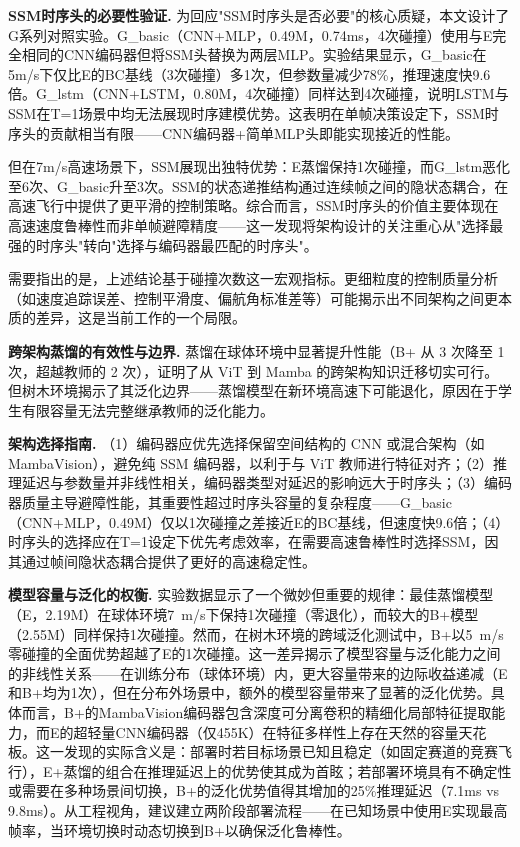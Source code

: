 \documentclass[12pt,a4paper]{article}
\numberwithin{equation}{section}
\numberwithin{figure}{section}
\numberwithin{table}{section}
\begin{document}
\textbf{SSM时序头的必要性验证.} 为回应"SSM时序头是否必要"的核心质疑，本文设计了G系列对照实验。G\_basic（CNN+MLP，0.49M，0.74ms，4次碰撞）使用与E完全相同的CNN编码器但将SSM头替换为两层MLP。实验结果显示，G\_basic在5m/s下仅比E的BC基线（3次碰撞）多1次，但参数量减少78\%，推理速度快9.6倍。G\_lstm（CNN+LSTM，0.80M，4次碰撞）同样达到4次碰撞，说明LSTM与SSM在T=1场景中均无法展现时序建模优势。这表明在单帧决策设定下，SSM时序头的贡献相当有限——CNN编码器+简单MLP头即能实现接近的性能。

但在7m/s高速场景下，SSM展现出独特优势：E蒸馏保持1次碰撞，而G\_lstm恶化至6次、G\_basic升至3次。SSM的状态递推结构通过连续帧之间的隐状态耦合，在高速飞行中提供了更平滑的控制策略。综合而言，SSM时序头的价值主要体现在高速速度鲁棒性而非单帧避障精度——这一发现将架构设计的关注重心从"选择最强的时序头"转向"选择与编码器最匹配的时序头"。

需要指出的是，上述结论基于碰撞次数这一宏观指标。更细粒度的控制质量分析（如速度追踪误差、控制平滑度、偏航角标准差等）可能揭示出不同架构之间更本质的差异，这是当前工作的一个局限。

\textbf{跨架构蒸馏的有效性与边界.} 蒸馏在球体环境中显著提升性能（B+ 从 3 次降至 1 次，超越教师的 2 次），证明了从 ViT 到 Mamba 的跨架构知识迁移切实可行。但树木环境揭示了其泛化边界——蒸馏模型在新环境高速下可能退化，原因在于学生有限容量无法完整继承教师的泛化能力。

\textbf{架构选择指南.} （1）编码器应优先选择保留空间结构的 CNN 或混合架构（如 MambaVision），避免纯 SSM 编码器，以利于与 ViT 教师进行特征对齐；（2）推理延迟与参数量并非线性相关，编码器类型对延迟的影响远大于时序头；（3）编码器质量主导避障性能，其重要性超过时序头容量的复杂程度——G\_basic（CNN+MLP，0.49M）仅以1次碰撞之差接近E的BC基线，但速度快9.6倍；（4）时序头的选择应在T=1设定下优先考虑效率，在需要高速鲁棒性时选择SSM，因其通过帧间隐状态耦合提供了更好的高速稳定性。

\textbf{模型容量与泛化的权衡.} 实验数据显示了一个微妙但重要的规律：最佳蒸馏模型（E，2.19M）在球体环境7~m/s下保持1次碰撞（零退化），而较大的B+模型（2.55M）同样保持1次碰撞。然而，在树木环境的跨域泛化测试中，B+以5~m/s零碰撞的全面优势超越了E的1次碰撞。这一差异揭示了模型容量与泛化能力之间的非线性关系——在训练分布（球体环境）内，更大容量带来的边际收益递减（E和B+均为1次），但在分布外场景中，额外的模型容量带来了显著的泛化优势。具体而言，B+的MambaVision编码器包含深度可分离卷积的精细化局部特征提取能力，而E的超轻量CNN编码器（仅455K）在特征多样性上存在天然的容量天花板。这一发现的实际含义是：部署时若目标场景已知且稳定（如固定赛道的竞赛飞行），E+蒸馏的组合在推理延迟上的优势使其成为首眩；若部署环境具有不确定性或需要在多种场景间切换，B+的泛化优势值得其增加的25\%推理延迟（7.1ms vs 9.8ms）。从工程视角，建议建立两阶段部署流程——在已知场景中使用E实现最高帧率，当环境切换时动态切换到B+以确保泛化鲁棒性。
\end{document}
